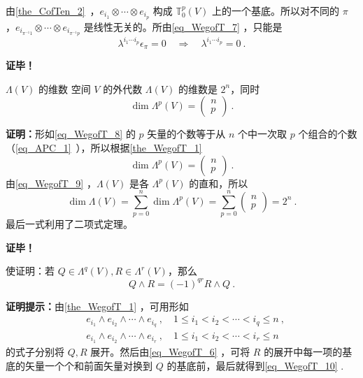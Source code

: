 由\autoref{the_CofTen_2}~，$e_{i_1}\otimes\cdots\otimes e_{i_p}$ 构成 $\mathbb T_0^p(V)$ 上的一个基底。所以对不同的 $\pi$ ，$e_{i_{\pi^{-1} 1}}\otimes\cdots\otimes e_{i_{\pi^{-1} p}}$ 是线性无关的。所由\autoref{eq_WegofT_7}  ，只能是
\begin{equation}
\lambda^{i_1\cdots i_p}\epsilon_\pi=0\quad\Rightarrow\quad\lambda^{i_1\cdots i_p}=0~.
\end{equation}

\textbf{证毕！}
\begin{corollary}{ $\Lambda(V)$ 的维数}
空间 $V$ 的外代数 $\Lambda(V)$ 的维数是 $2^n$，同时
\begin{equation}
\dim\Lambda^p(V)=\left(\begin{aligned}
n\\p
\end{aligned}\right)~.
\end{equation}
\end{corollary}
\textbf{证明：}形如\autoref{eq_WegofT_8}  的 $p$ 矢量的个数等于从 $n$ 个中一次取 $p$ 个组合的个数（\autoref{eq_APC_1}~），所以根据\autoref{the_WegofT_1} 
\begin{equation}
\dim\Lambda^p(V)=\left(\begin{aligned}
n\\p
\end{aligned}\right)~.
\end{equation}
由\autoref{eq_WegofT_9}  ，$\Lambda(V)$ 是各 $\Lambda^p(V)$ 的直和，所以
\begin{equation}
\dim\Lambda(V)=\sum_{p=0}^n\dim\Lambda^p(V)=\sum_{p=0}^n\left(\begin{aligned}
n\\p
\end{aligned}\right)=2^n~.
\end{equation}
 最后一式利用了二项式定理。

\textbf{证毕！}

\begin{example}{}
使证明：若 $Q\in\Lambda^q(V), R\in\Lambda^r(V)$，那么
\begin{equation}\label{eq_WegofT_10}
Q\wedge R=(-1)^{qr}R\wedge Q~.
\end{equation}

\textbf{证明提示：}由\autoref{the_WegofT_1}  ，可用形如
 \begin{equation}
\begin{aligned}
&e_{i_1}\wedge e_{i_2}\wedge\cdots\wedge e_{i_q}~,\quad 1\leq i_1<i_2<\cdots<i_q\leq n~,\\
&e_{i_1}\wedge e_{i_2}\wedge\cdots\wedge e_{i_r}~,\quad 1\leq i_1<i_2<\cdots<i_r\leq n
\end{aligned}
\end{equation}
的式子分别将 $Q,R$ 展开。然后由\autoref{eq_WegofT_6}  ，可将 $R$ 的展开中每一项的基底的矢量一个个和前面矢量对换到 $Q$ 的基底前，最后就得到\autoref{eq_WegofT_10} .
\end{example}
